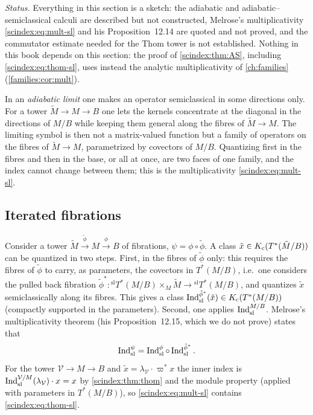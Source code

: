 \emph{Status.} Everything in this section is a sketch: the adiabatic and
adiabatic--semiclassical calculi are described but not constructed, Melrose's
multiplicativity \eqref{scindex:eq:mult-sl} and his Proposition~12.14 are quoted
and not proved, and the commutator estimate needed for the Thom tower is not
established. Nothing in this book depends on this section: the proof of
\cref{scindex:thm:AS}, including \eqref{scindex:eq:thom-sl}, uses instead the
analytic multiplicativity of \cref{ch:families} (\cref{families:cor:mult}).

\begin{discussion}
  In an \emph{adiabatic limit} one makes an operator semiclassical in some
  directions only. For a tower $\tilde M\to M\to B$ one lets the kernels
  concentrate at the diagonal in the directions of $M/B$ while keeping them
  general along the fibres of $\tilde M\to M$. The limiting symbol is
  then not a matrix-valued function but a family of operators on the fibres of
  $\tilde M\to M$, parametrized by covectors of $M/B$. Quantizing first in the
  fibres and then in the base, or all at once, are two faces of one family, and
  the index cannot change between them; this is the multiplicativity
  \eqref{scindex:eq:mult-sl}.
\end{discussion}

\subsection{Iterated fibrations}
Consider a tower $\tilde M\xrightarrow{\tilde\phi}M\xrightarrow{\phi}B$ of
fibrations, $\psi=\phi\circ\tilde\phi$. A class $\tilde x\in K_{\mathrm{c}}(T^*(\tilde M/B))$
can be quantized in two steps. First, in the fibres of $\tilde\phi$ only: this
requires the fibres of $\tilde\phi$ to carry, as parameters, the covectors in
$T^*(M/B)$, i.e.\ one considers the pulled back fibration
$\tilde\phi^*:{}^{\mathrm{sl}}T^*(M/B)\times_M\tilde M\to{}^{\mathrm{sl}}T^*(M/B)$,
and quantizes $\tilde x$ semiclassically along its fibres. This gives a class
$\operatorname{Ind}^{\tilde\phi^*}_{\mathrm{sl}}(\tilde x)\in K_{\mathrm{c}}(T^*(M/B))$ (compactly supported in the
parameters). Second, one applies $\operatorname{Ind}^{M/B}_{\mathrm{sl}}$. Melrose's multiplicativity
theorem (his Proposition~12.15, which we do not prove) states that
\begin{equation}\label{scindex:eq:mult-sl}
  \operatorname{Ind}^{\psi}_{\mathrm{sl}}=\operatorname{Ind}^{\phi}_{\mathrm{sl}}\circ\operatorname{Ind}^{\tilde\phi^*}_{\mathrm{sl}}.
\end{equation}
For the tower $\mathcal V\to M\to B$ and $\tilde x=\lambda_{\mathcal V}\cdot
\varpi^*x$ the inner index is $\operatorname{Ind}^{\mathcal V/M}_{\mathrm{sl}}(\lambda_{\mathcal V})\cdot x=x$
by \cref{scindex:thm:thom} and the module property (applied with parameters in
$T^*(M/B)$), so \eqref{scindex:eq:mult-sl} contains \eqref{scindex:eq:thom-sl}.

